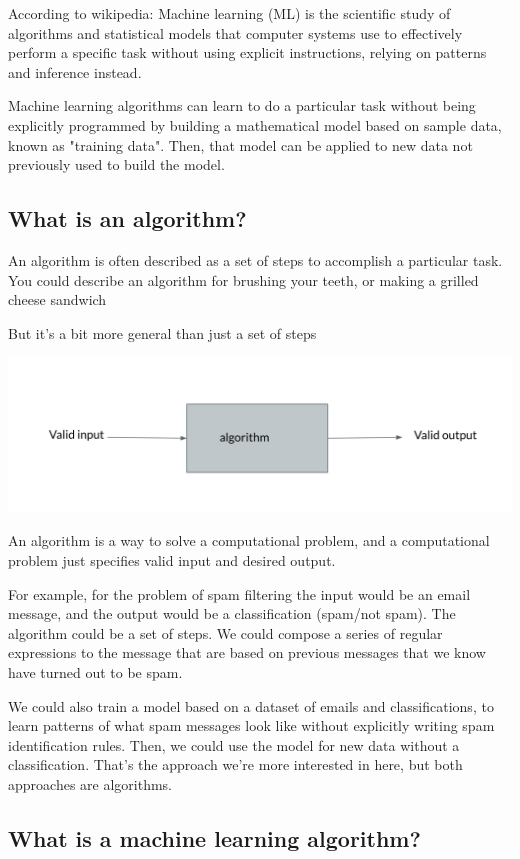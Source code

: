 \documentclass[12pt]{article}
\begin{document}
According to wikipedia:
Machine learning (ML) is the scientific study of algorithms and statistical models that computer systems use to 
effectively perform a specific task without using explicit instructions, relying on patterns and inference instead.


Machine learning algorithms can learn to do a particular task without being explicitly programmed by building a 
mathematical model based on sample data, known as "training data". Then, that model can be applied to new data
not previously used to build the model.

\subsection{What is an algorithm?}

An algorithm is often described as a set of steps to accomplish a particular task. You could describe an algorithm for brushing your teeth, or making a grilled cheese sandwich 

But it's a bit more general than just a set of steps 

\includegraphics[width={\textwidth}]{algo-abstract}


An algorithm is a way to solve a computational problem, and a computational problem just specifies valid input and desired output. 

For example, for the problem of spam filtering the input would be an email message, and the output would be a 
classification (spam/not spam). The algorithm could be a set of steps. We could compose a series of regular expressions to 
the message that are based on previous messages that we know have turned out to be spam. 

We could also train a model based on a dataset of emails and classifications, to learn patterns of what spam messages
look like without explicitly writing spam identification rules. Then, we could use the model for new data without a
classification. That's the approach we're more interested in here, but both approaches are algorithms.

\subsection{What is a machine learning algorithm?}
\end{document}
